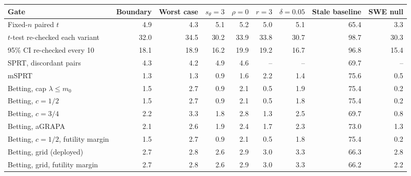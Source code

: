 \begin{tabular}{lrrrrrrrr}
\toprule
Gate & Boundary & Worst case & $s_\theta=3$ & $\rho=0$ & $r=3$ & $\delta=0.05$ & Stale baseline & SWE null \\
\midrule
Fixed-$n$ paired $t$ & 4.9 & 4.3 & 5.1 & 5.2 & 5.0 & 5.1 & 65.4 & 3.3 \\
$t$-test re-checked each variant & 32.0 & 34.5 & 30.2 & 33.9 & 33.8 & 30.7 & 98.7 & 30.3 \\
95\% CI re-checked every 10 & 18.1 & 18.9 & 16.2 & 19.9 & 19.2 & 16.7 & 96.8 & 15.4 \\
SPRT, discordant pairs & 4.3 & 4.2 & 4.9 & 4.6 & -- & -- & 69.7 & -- \\
mSPRT & 1.3 & 1.3 & 0.9 & 1.6 & 2.2 & 1.4 & 75.6 & 0.5 \\
Betting, cap $\lambda\le m_0$ & 1.5 & 2.7 & 0.9 & 2.1 & 0.5 & 1.9 & 75.4 & 0.2 \\
Betting, $c=1/2$ & 1.5 & 2.7 & 0.9 & 2.1 & 0.5 & 1.8 & 75.4 & 0.2 \\
Betting, $c=3/4$ & 2.2 & 3.3 & 1.8 & 2.8 & 1.3 & 2.5 & 69.7 & 0.8 \\
Betting, aGRAPA & 2.1 & 2.6 & 1.9 & 2.4 & 1.7 & 2.3 & 73.0 & 1.3 \\
Betting, $c=1/2$, futility margin & 1.5 & 2.7 & 0.9 & 2.1 & 0.5 & 1.8 & 75.4 & 0.2 \\
Betting, grid (deployed) & 2.7 & 2.8 & 2.6 & 2.9 & 3.0 & 3.3 & 66.3 & 2.8 \\
Betting, grid, futility margin & 2.7 & 2.8 & 2.6 & 2.9 & 3.0 & 3.3 & 66.2 & 2.2 \\
\bottomrule
\end{tabular}
